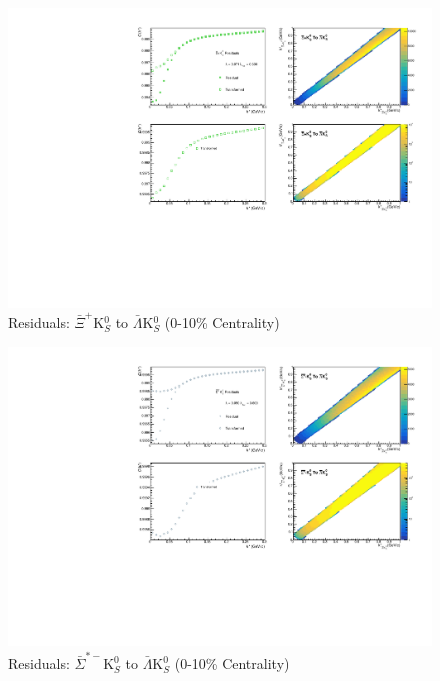\documentclass[../AnalysisNoteJBuxton.tex]{subfiles}
\begin{document}
\begin{figure}[h]
  \centering
  \includegraphics[width=\textwidth]{9_AdditionalFigures/Figures/Residuals/ALamK0/Residuals_ALamK0_0010_AXiK0_MomResCrctn_NonFlatBgdCrctn_SingleLamParam_10Res_PrimMaxDecay4fm_UsingXiDataAndCoulombOnly.pdf}
  \caption[Residuals: $\bar{\Xi}^{+}$K$^{0}_{S}$ to $\bar{\Lambda}$K$^{0}_{S}$ (0-10\% Centrality)]{Residuals: $\bar{\Xi}^{+}$K$^{0}_{S}$ to $\bar{\Lambda}$K$^{0}_{S}$ (0-10\% Centrality)}
  \label{fig:Res_ALamK0_0010_AXiCK0}
\end{figure}


\begin{figure}[h]
  \centering
  \includegraphics[width=\textwidth]{9_AdditionalFigures/Figures/Residuals/ALamK0/Residuals_ALamK0_0010_ASigStMK0_MomResCrctn_NonFlatBgdCrctn_SingleLamParam_10Res_PrimMaxDecay4fm_UsingXiDataAndCoulombOnly.pdf}
  \caption[Residuals: $\bar{\Sigma}^{*-}$K$^{0}_{S}$ to $\bar{\Lambda}$K$^{0}_{S}$ (0-10\% Centrality)]{Residuals: $\bar{\Sigma}^{*-}$K$^{0}_{S}$ to $\bar{\Lambda}$K$^{0}_{S}$ (0-10\% Centrality)}
  \label{fig:Res_ALamK0_0010_ASigStMK0}
\end{figure}
\end{document}
